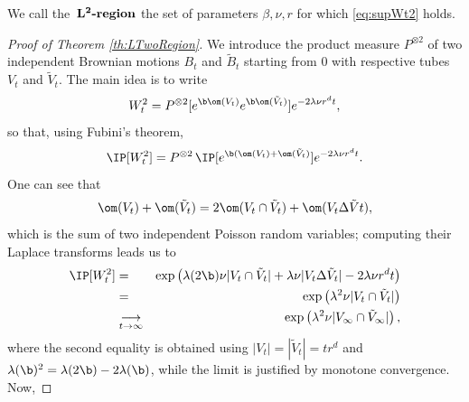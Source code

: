 \begin{definition}We call the $\,\textbf{$\bf{L^2}$-region}$ the set of parameters $\beta, \nu, r$ for which \eqref{eq:supWt2} holds.\end{definition}

\begin{proof}[Proof of Theorem \ref{th:LTwoRegion}]
We introduce the product measure $P^{\otimes 2}$ of two independent Brownian motions $B_t$ and $\tilde{B}_t$ starting from $0$ with respective tubes $V_t$ and $\tilde{V}_t$. The main idea is to write
\[W_t^2 = P^{\otimes 2} [e^{\b \om(V_t)} e^{\b \om(\tilde{V}_t)}]e^{-2\lambda \nu r^d t},\]
so that, using Fubini's theorem,
\begin{equation} \IP[W_t^2] = P^{\otimes 2} \, \IP [e^{\b (\om(V_t)+ \om(\tilde{V}_t)}]e^{-2\lambda \nu r^d t}.
\end{equation}
One can see that \[\om(V_t) + \om(\tilde{V}_t) = 2\om(V_t \cap \tilde{V}_t) + \om(V_t \Delta \tilde{V}t),\]
which is the sum of two independent Poisson random variables; computing their Laplace transforms leads us to
\begin{eqnarray}
 \IP[W_t^2]
\nonumber 
&=& \exp \left( \lambda(2\b) \nu |V_t \cap \tilde{V}_t| + \lambda \nu |V_t \Delta \tilde{V}_t| - 2\lambda \nu r^d t \right) \nonumber \\
&=& \exp\left(\lambda^2 \nu |V_t \cap \tilde{V}_t| \right) \nonumber \\
\label{eq:cvWt2} &\underset{t\to\infty}{\longrightarrow}& \exp\left(\lambda^2 \nu |V_\infty \cap \tilde{V}_\infty| \right), 
\end{eqnarray}
where the second equality is obtained using $|V_t|=|\tilde{V}_t|=tr^d$ and $\lambda(\b)^2=\lambda(2\b)-2\lambda(\b)$, while the limit is justified by monotone convergence.
Now,

\end{proof}
